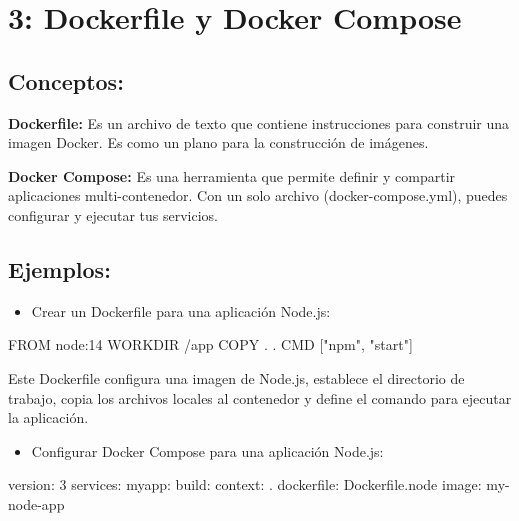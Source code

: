 \documentclass[
  a4paper,
  DIV=11,
  numbers=noendperiod,
  onepage,
  openany]{scrreprt}
\newenvironment{Shaded}{\begin{snugshade}}{\end{snugshade}}
\newcommand{\AttributeTok}[1]{\textcolor[rgb]{0.40,0.45,0.13}{#1}}
\newcommand{\FunctionTok}[1]{\textcolor[rgb]{0.28,0.35,0.67}{#1}}
\newcommand{\KeywordTok}[1]{\textcolor[rgb]{0.00,0.23,0.31}{#1}}
\newcommand{\NormalTok}[1]{\textcolor[rgb]{0.00,0.23,0.31}{#1}}
\newcommand{\StringTok}[1]{\textcolor[rgb]{0.13,0.47,0.30}{#1}}
\providecommand{\tightlist}{%
  \setlength{\itemsep}{0pt}\setlength{\parskip}{0pt}}\usepackage{longtable,booktabs,array}
\begin{document}
\hypertarget{dockerfile-y-docker-compose}{%
\chapter{3: Dockerfile y Docker
Compose}\label{dockerfile-y-docker-compose}}

\hypertarget{conceptos-2}{%
\section{Conceptos:}\label{conceptos-2}}

\textbf{Dockerfile:} Es un archivo de texto que contiene instrucciones
para construir una imagen Docker. Es como un plano para la construcción
de imágenes.

\textbf{Docker Compose:} Es una herramienta que permite definir y
compartir aplicaciones multi-contenedor. Con un solo archivo
(docker-compose.yml), puedes configurar y ejecutar tus servicios.

\hypertarget{ejemplos-2}{%
\section{Ejemplos:}\label{ejemplos-2}}

\begin{itemize}
\tightlist
\item
  Crear un Dockerfile para una aplicación Node.js:
\end{itemize}

\begin{Shaded}
\begin{Highlighting}[]
\KeywordTok{FROM}\NormalTok{ node:14}
\KeywordTok{WORKDIR}\NormalTok{ /app}
\KeywordTok{COPY}\NormalTok{ . .}
\KeywordTok{CMD}\NormalTok{ [}\StringTok{"npm"}\NormalTok{, }\StringTok{"start"}\NormalTok{]}
\end{Highlighting}
\end{Shaded}

Este Dockerfile configura una imagen de Node.js, establece el directorio
de trabajo, copia los archivos locales al contenedor y define el comando
para ejecutar la aplicación.

\begin{itemize}
\tightlist
\item
  Configurar Docker Compose para una aplicación Node.js:
\end{itemize}

\begin{Shaded}
\begin{Highlighting}[]
\AttributeTok{    }\FunctionTok{version}\KeywordTok{:}\AttributeTok{ }\StringTok{\textquotesingle{}3\textquotesingle{}}
\AttributeTok{    }\FunctionTok{services}\KeywordTok{:}
\AttributeTok{      }\FunctionTok{myapp}\KeywordTok{:}
\AttributeTok{        }\FunctionTok{build}\KeywordTok{:}
\AttributeTok{          }\FunctionTok{context}\KeywordTok{:}\AttributeTok{ .}
\AttributeTok{          }\FunctionTok{dockerfile}\KeywordTok{:}\AttributeTok{ Dockerfile.node}
\AttributeTok{        }\FunctionTok{image}\KeywordTok{:}\AttributeTok{ my{-}node{-}app}
\end{Highlighting}
\end{Shaded}
\end{document}
